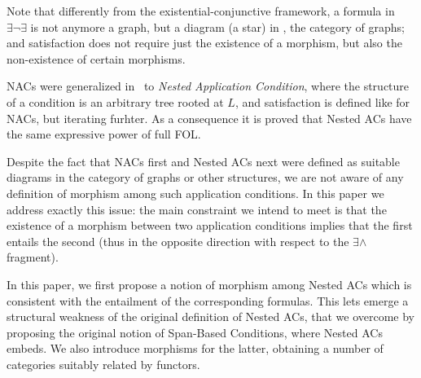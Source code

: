  Note that differently from the existential-conjunctive framework, a formula in $\exists \neg \exists$ is not anymore a graph, but a diagram (a star) in , the category of graphs; and satisfaction does not require just the existence of a morphism, but also the non-existence of certain morphisms.

 NACs were generalized in~\cite{Rensink-FOL,Habel-FOL} to \emph{Nested Application Condition}, where the structure of a condition is an arbitrary tree rooted at $L$, and satisfaction is defined like for NACs, but iterating furhter. As a consequence it is proved that Nested ACs have the same expressive power of full FOL.

 Despite the fact that NACs first and Nested ACs next were defined as suitable diagrams in the category of graphs or other structures, we are not aware of any definition of morphism among such application conditions. In this paper we address exactly this issue: the main constraint we intend to meet is that the existence of a morphism between two application conditions implies that the first entails the second (thus in the opposite direction with respect to the $\exists\wedge$ fragment).
 
\medskip\noindent
In this paper, we first propose a notion of morphism among Nested ACs which is consistent with the entailment of the corresponding formulas. This lets emerge
a structural weakness of the original definition of Nested ACs, that we overcome by proposing the original notion of Span-Based Conditions, where Nested ACs embeds. We also introduce morphisms for the latter, obtaining a number of categories suitably related by functors. 
 
 